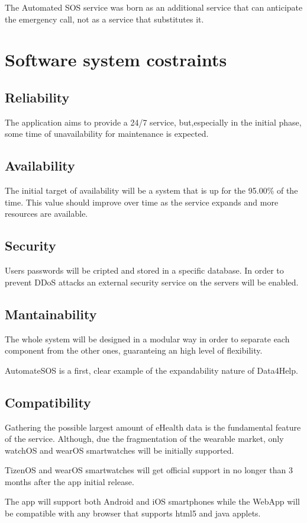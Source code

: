The Automated SOS service was born as an additional service that can anticipate the emergency call, not as a service that substitutes it.


\section{Software system costraints}
\subsection{Reliability}
The application aims to provide a 24/7 service, but,especially in the initial phase, some time of unavailability for maintenance is expected.
\subsection{Availability}
The initial target of availability will be a system that is up for the 95.00\% of the time. This value should improve over time as the service expands and more resources are available.
\subsection{Security}
Users passwords will be cripted and stored in a specific database.
In order to prevent DDoS attacks an external security service on the servers will be enabled.
\subsection{Mantainability}
The whole system will be designed in a modular way in order to separate each component from the other ones, guaranteing an high level of flexibility. 

AutomateSOS is a first, clear example of the expandability nature of Data4Help.
\subsection{Compatibility}
Gathering the possible largest amount of eHealth data is the fundamental feature of the service. Although, due the fragmentation of the wearable market, only watchOS and wearOS smartwatches will be initially supported. 

TizenOS and wearOS smartwatches will get official support in no longer than 3 months after the app initial release.

The app will support both Android and iOS smartphones while the WebApp will be compatible with any browser that supports html5 and java applets.